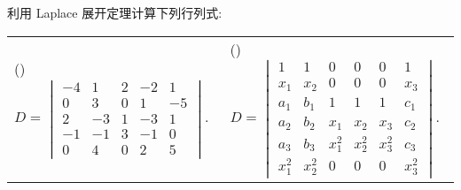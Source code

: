 \begin{example}
    利用 Laplace 展开定理计算下列行列式:
    \setcounter{magicrownumbers}{0}
    \begin{table}[H]
        \centering
        \begin{tabular}{l || l}
            (\rownumber{}) $D=\begin{vmatrix}
                                      -4 & 1  & 2 & -2 & 1  \\
                                      0  & 3  & 0 & 1  & -5 \\
                                      2  & -3 & 1 & -3 & 1  \\
                                      -1 & -1 & 3 & -1 & 0  \\
                                      0  & 4  & 0 & 2  & 5
                                  \end{vmatrix}.$
             & (\rownumber{}) $\displaystyle
                D=\begin{vmatrix}
                      1     & 1     & 0     & 0     & 0     & 1     \\
                      x_1   & x_2   & 0     & 0     & 0     & x_3   \\
                      a_1   & b_1   & 1     & 1     & 1     & c_1   \\
                      a_2   & b_2   & x_1   & x_2   & x_3   & c_2   \\
                      a_3   & b_3   & x_1^2 & x_2^2 & x_3^2 & c_3   \\
                      x_1^2 & x_2^2 & 0     & 0     & 0     & x_3^2
                  \end{vmatrix}.$
        \end{tabular}
    \end{table}
\end{example}
